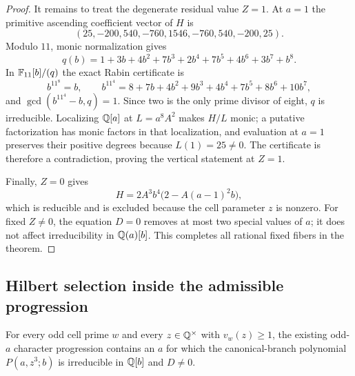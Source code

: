 \begin{proof}
It remains to treat the degenerate residual value $Z=1$.  At $a=1$ the
primitive ascending coefficient vector of $H$ is
\[
 (25,-200,540,-760,1546,-760,540,-200,25).
\]
Modulo $11$, monic normalization gives
\[
 q(b)=1+3b+4b^2+7b^3+2b^4+7b^5+4b^6+3b^7+b^8.
\]
In $\mathbb{F}_{11}[b]/(q)$ the exact Rabin certificate is
\[
 b^{11^8}=b,\qquad
 b^{11^4}=8+7b+4b^2+9b^3+4b^4+7b^5+8b^6+10b^7,
\]
and $\gcd(b^{11^4}-b,q)=1$.  Since two is the only prime divisor of
eight, $q$ is irreducible.  Localizing $\mathbb{Q}[a]$ at
$L=a^8A^2$ makes $H/L$ monic; a putative factorization has monic factors
in that localization, and evaluation at $a=1$ preserves their positive
degrees because $L(1)=25\ne0$.  The certificate is therefore a
contradiction, proving the vertical statement at $Z=1$.

Finally, $Z=0$ gives
\[
 H=2A^3b^4\bigl(2-A(a-1)^2b\bigr),
\]
which is reducible and is excluded because the cell parameter $z$ is
nonzero.  For fixed $Z\ne0$, the equation $D=0$ removes at most two
special values of $a$; it does not affect irreducibility in
$\mathbb{Q}(a)[b]$.  This completes all rational fixed fibers in the theorem.
\end{proof}

\subsection{Hilbert selection inside the admissible progression}

\begin{corollary}
\label{cor:admissible-irred}
For every odd cell prime $w$ and every $z\in\mathbb{Q}^\times$ with
$v_w(z)\ge1$, the existing odd-$a$ character progression contains an
$a$ for which the canonical-branch polynomial $P(a,z^3;b)$ is
irreducible in $\mathbb{Q}[b]$ and $D\ne0$.
\end{corollary}

